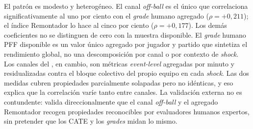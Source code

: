 El patrón es modesto y heterogéneo. El canal \textit{off-ball} es el
único que correlaciona significativamente al uno por ciento con el
\textit{grade} humano agregado ($\rho = +0{,}211$); el índice
Remontador lo hace al cinco por ciento ($\rho = +0{,}177$). Los demás
coeficientes no se distinguen de cero con la muestra disponible.
El \textit{grade} humano PFF disponible es un valor único agregado
por jugador y partido que sintetiza el rendimiento global, no una
descomposición por canal o por contexto de \textit{shock}. Los
canales del \CCV, en cambio, son métricas \textit{event-level}
agregadas por minuto y residualizadas contra el bloque colectivo del
propio equipo en cada \textit{shock}. Las dos medidas cubren
propiedades parcialmente solapadas pero no idénticas, y eso explica
que la correlación varíe tanto entre canales. La validación externa
no es contundente: valida direccionalmente que el canal
\textit{off-ball} y el agregado Remontador recogen propiedades
reconocibles por evaluadores humanos expertos, sin pretender que los
CATE y los \textit{grades} midan lo mismo.
